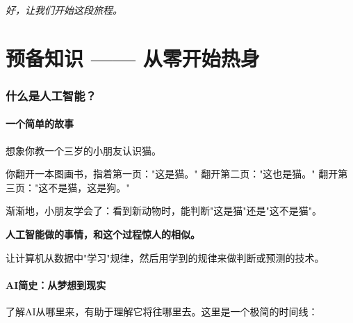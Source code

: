 \documentclass[11pt,a4paper]{ctexart}
\begin{document}
\vspace{6pt}
\begin{center}
\textit{好，让我们开始这段旅程。}
\end{center}

\newpage
\tableofcontents
\newpage

\part{预备知识 —— 从零开始热身}

\section{什么是人工智能？}

\subsection{一个简单的故事}

想象你教一个三岁的小朋友认识猫。

你翻开一本图画书，指着第一页："这是猫。" 翻开第二页："这也是猫。"
翻开第三页："这不是猫，这是狗。"

渐渐地，小朋友学会了：看到新动物时，能判断"这是猫"还是"这不是猫"。

\textbf{人工智能做的事情，和这个过程惊人的相似。}

\begin{defbox}
让计算机从数据中"学习"规律，然后用学到的规律来做判断或预测的技术。
\end{defbox}

\subsection{AI简史：从梦想到现实}

了解AI从哪里来，有助于理解它将往哪里去。这里是一个极简的时间线：
\end{document}
